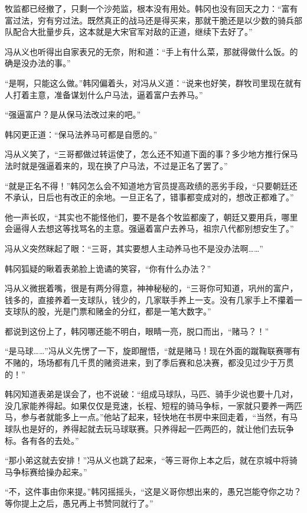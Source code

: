 牧监都已经撤了，只剩一个沙苑监，根本没有用处。韩冈也没有回天之力：“富有富过法，穷有穷过法。既然真正的战马还是得买来，那就干脆还是以少数的骑兵部队配合大批量步兵，这本就是大宋官军对敌的正道，继续下去好了。”

冯从义也听得出自家表兄的无奈，附和道：“手上有什么菜，那就得做什么饭。的确是没办法的事。”

“是啊，只能这么做。”韩冈偏着头，对冯从义道：“说来也好笑，群牧司里现在就有人打着主意，准备谋划什么户马法，逼着富户去养马。”

“强逼富户？是从保马法改过来的吧。”

韩冈更正道：“保马法养马可都是自愿的。”

冯从义笑了，“三哥都做过转运使了，怎么还不知道下面的事？多少地方推行保马法时就是强逼着来的，现在换了户马法，不过是正名了罢了。”

“就是正名不得！”韩冈怎么会不知道地方官员提高政绩的恶劣手段，“只要朝廷还不承认，日后也有改正的余地。一旦正名了，错事都变成对的，想改正都难了。”

他一声长叹，“其实也不能怪他们，要不是各个牧监都废了，朝廷又要用兵，哪里会逼得人去想这等找骂名的主意。强逼着富户去养马，祖宗八代都别想安生了。”

冯从义突然眯起了眼：“三哥，其实要想人主动养马也不是没办法啊……”

韩冈狐疑的瞅着表弟脸上诡谲的笑容，“你有什么办法？”

冯从义微抿着嘴，很是有两分得意，神神秘秘的，“三哥你可知道，巩州的富户，钱多的，直接养着一支球队，钱少的，几家联手养上一支。没有几家手上不攥着一支球队的股，光是门票和赌金的分红，都是一笔大数字。”

都说到这份上了，韩冈哪还能不明白，眼睛一亮，脱口而出，“赌马？！”

“是马球……”冯从义先愣了一下，旋即醒悟，“就是赌马！现在外面的蹴鞠联赛哪有不赌的，场场都有几千贯的赌资进来，到了季后赛和总决赛，都没见过少于万贯的！”

韩冈知道表弟是误会了，也不说破：“组成马球队，马匹、骑手少说也要十几对，没几家能养得起。如果仅仅是竞速，长程、短程的骑马争标，一家就只要养一两匹马，参与者就能多上一点。”他站了起来，轻快地在书房中来回走着，“当然，有马球队也是好的，养得起就去玩马球联赛。只养得起一匹两匹的，就让他们去玩争标。各有各的去处。”

“那小弟这就去安排！”冯从义也跳了起来，“等三哥你上本之后，就在京城中将骑马争标赛给操办起来。”

“不，这件事由你来提。”韩冈摇摇头，“这是义哥你想出来的，愚兄岂能夺你之功？等你提上之后，愚兄再上书赞同就行了。”

